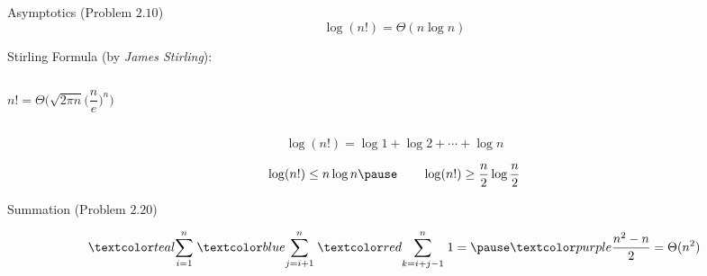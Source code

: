 \begin{frame}{}
  \begin{exampleblock}{Asymptotics (Problem $2.10$)}
    \[
      \log(n!) = \Theta(n \log n)
    \]
  \end{exampleblock}

  \pause
  \vspace{0.30cm}
  \begin{alertblock}{Stirling Formula (by {\it James Stirling}):}
    \begin{columns}
	\[
	  n! = \Theta\Big(\sqrt{2 \pi n} \Big(\frac{n}{e}\Big)^{n}\Big)
	\]
    \end{columns}
  \end{alertblock}

  \pause
  \vspace{0.30cm}
  \[
    \log (n!) = \log 1 + \log 2 + \cdots + \log n
  \]

  \pause
  \[
    \log (n!) \le n \log n \pause \qquad \log (n!) \ge \frac{n}{2} \log \frac{n}{2}
  \]
\end{frame}

\begin{frame}{}
  \begin{exampleblock}{Summation (Problem $2.20$)}
    
  \end{exampleblock}

  \pause
  \[
    \teal{\sum_{i=1}^{n}}\; \blue{\sum_{j=i+1}^{n}}\; \red{\sum_{k=i+j-1}^{n}}\; 1 = \pause \purple{\frac{n^2-n}{2}} = \Theta(n^2)
  \]
\end{frame}
